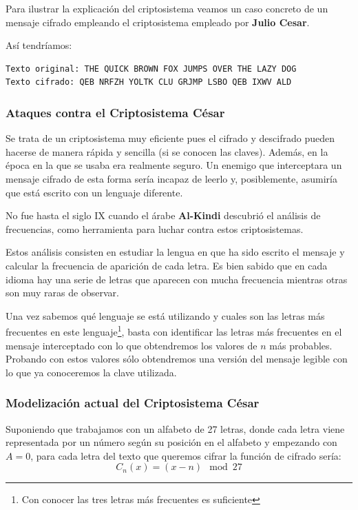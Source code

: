 \documentclass[nochap]{apuntesURJC}
\begin{document}
Para ilustrar la explicación del criptosistema veamos un caso concreto de un mensaje cifrado empleando el criptosistema empleado por \textbf{Julio Cesar}.

Así tendríamos:

\begin{verbatim}
Texto original: THE QUICK BROWN FOX JUMPS OVER THE LAZY DOG
Texto cifrado: QEB NRFZH YOLTK CLU GRJMP LSBO QEB IXWV ALD
\end{verbatim}

\subsubsection{Ataques contra el Criptosistema César}
Se trata de un criptosistema muy eficiente pues el cifrado y descifrado pueden hacerse de manera rápida y sencilla (si se conocen las claves). Además, en la época en la que se usaba era realmente seguro. Un enemigo que interceptara un mensaje cifrado de esta forma sería incapaz de leerlo y, posiblemente, asumiría que está escrito con un lenguaje diferente.

No fue hasta el siglo IX cuando el árabe \textbf{Al-Kindi} descubrió el análisis de frecuencias, como herramienta para luchar contra estos criptosistemas.

Estos análisis consisten en estudiar la lengua en que ha sido escrito el mensaje y calcular la frecuencia de aparición de cada letra. Es bien sabido que en cada idioma hay una serie de letras que aparecen con mucha frecuencia mientras otras son muy raras de observar.

Una vez sabemos qué lenguaje se está utilizando y cuales son las letras más frecuentes en este lenguaje\footnote{Con conocer las tres letras más frecuentes es suficiente}, basta con identificar las letras más frecuentes en el mensaje interceptado con lo que obtendremos los valores de $n$ más probables. Probando con estos valores sólo obtendremos una versión del mensaje legible con lo que ya conoceremos la clave utilizada.

\subsubsection{Modelización actual del Criptosistema César}

Suponiendo que trabajamos con un alfabeto de 27 letras, donde cada letra viene representada por un número según su posición en el alfabeto y empezando con $A=0$, para cada letra del texto que queremos cifrar la función de cifrado sería:
\[C_n(x)=(x-n) \mod 27\]
\end{document}
